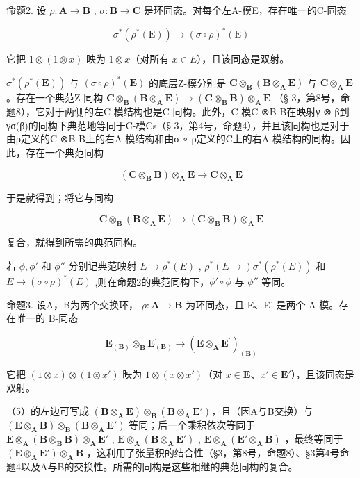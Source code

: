 命题2. 设 \(\rho: \mathbf{A} \to \mathbf{B}\) , \(\sigma: \mathbf{B} \to \mathbf{C}\) 是环同态。对每个左A-模E，存在唯一的C-同态

\[
\sigma^ {*} (\rho^ {*} (\mathrm{E})) \rightarrow (\sigma \circ \rho) ^ {*} (\mathrm{E})\tag{4}
\]

它把 \(1 \otimes (1 \otimes x)\) 映为 \(1 \otimes x\)（对所有 \(x \in E\)），且该同态是双射。

\(\sigma^{*}(\rho^{*}(\mathbf{E}))\) 与 \((\sigma \circ \rho)^{*}(\mathbf{E})\) 的底层Z-模分别是 \(\mathbf{C} \otimes_{\mathbf{B}} (\mathbf{B} \otimes_{\mathbf{A}} \mathbf{E})\) 与 \(\mathbf{C} \otimes_{\mathbf{A}} \mathbf{E}\)。存在一个典范Z-同构 \(\mathbf{C} \otimes_{\mathbf{B}} (\mathbf{B} \otimes_{\mathbf{A}} \mathbf{E}) \to (\mathbf{C} \otimes_{\mathbf{B}} \mathbf{B}) \otimes_{\mathbf{A}} \mathbf{E}\) （§ 3，第8号，命题8），它对于两侧的左C-模结构也是C-同构。此外，C-模C ⊗B B在映射γ ⊗ β到γσ(β)的同构下典范地等同于C-模Cs（§ 3，第4号，命题4），并且该同构也是对于由ρ定义的C ⊗B B上的右A-模结构和由σ ∘ ρ定义的C上的右A-模结构的同构。因此，存在一个典范同构

\[
(\mathbf {C} \otimes_ {\mathbf {B}} \mathbf {B}) \otimes_ {\mathbf {A}} \mathbf {E} \rightarrow \mathbf {C} \otimes_ {\mathbf {A}} \mathbf {E}
\]

于是就得到；将它与同构

\[
\mathbf {C} \otimes_ {\mathbf {B}} (\mathbf {B} \otimes_ {\mathbf {A}} \mathbf {E}) \rightarrow (\mathbf {C} \otimes_ {\mathbf {B}} \mathbf {B}) \otimes_ {\mathbf {A}} \mathbf {E}
\]

复合，就得到所需的典范同构。

若 \(\phi, \phi'\) 和 \(\phi''\) 分别记典范映射 \(E \to \rho^*(E)\) , \(\rho^*(E \to) \sigma^*(\rho^*(E))\) 和 \(E \to (\sigma \circ \rho)^*(E)\) ,则在命题2的典范同构下，\(\phi' \circ \phi\) 与 \(\phi''\) 等同。

命题3. 设A，B为两个交换环， \(\rho: \mathbf{A} \to \mathbf{B}\) 为环同态，且 E、E' 是两个 A-模。存在唯一的 B-同态

\[
\mathbf {E} _ {(\mathbf {B})} \otimes_ {\mathbf {B}} \mathbf {E} _ {(\mathbf {B})} ^ {\prime} \rightarrow (\mathbf {E} \otimes_ {\mathbf {A}} \mathbf {E} ^ {\prime}) _ {(\mathbf {B})}\tag{5}
\]

它把 \((1 \otimes x) \otimes (1 \otimes x')\) 映为 \(1 \otimes (x \otimes x')\)（对 \(x \in \mathbf{E}\)、\(x' \in \mathbf{E}'\)），且该同态是双射。

（5）的左边可写成 \((\mathbf{B} \otimes_{\mathbf{A}} \mathbf{E}) \otimes_{\mathbf{B}} (\mathbf{B} \otimes_{\mathbf{A}} \mathbf{E}')\)，且（因A与B交换）与 \((\mathbf{E} \otimes_{\mathbf{A}} \mathbf{B}) \otimes_{\mathbf{B}} (\mathbf{B} \otimes_{\mathbf{A}} \mathbf{E}')\) 等同；后一个乘积依次等同于 \(\mathbf{E} \otimes_{\mathbf{A}} (\mathbf{B} \otimes_{\mathbf{B}} \mathbf{B}) \otimes_{\mathbf{A}} \mathbf{E}'\) , \(\mathbf{E} \otimes_{\mathbf{A}} (\mathbf{B} \otimes_{\mathbf{A}} \mathbf{E}')\) , \(\mathbf{E} \otimes_{\mathbf{A}} (\mathbf{E}' \otimes_{\mathbf{A}} \mathbf{B})\) ，最终等同于 \((\mathbf{E} \otimes_{\mathbf{A}} \mathbf{E}') \otimes_{\mathbf{A}} \mathbf{B}\) ，这利用了张量积的结合性（§3，第8号，命题8）、§3第4号命题4以及A与B的交换性。所需的同构是这些相继的典范同构的复合。

